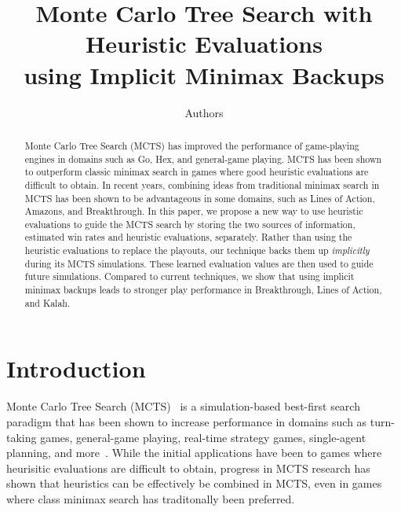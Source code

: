 \documentclass[letterpaper]{article}
\begin{document}
%
\title{Monte Carlo Tree Search with Heuristic Evaluations\\using Implicit Minimax Backups}
\author{Authors}

\maketitle

\begin{abstract}
Monte Carlo Tree Search (MCTS) has improved the performance of game-playing engines in 
domains such as Go, Hex, and general-game playing. MCTS has been shown to outperform 
classic minimax search in games where good heuristic evaluations are difficult to obtain. 
In recent years, combining ideas from traditional minimax search in MCTS has been shown to be advantageous in some domains, 
such as Lines of Action, Amazons, and Breakthrough.
In this paper, we propose 
a new way to use heuristic evaluations to guide the MCTS search by storing the two sources of 
information, estimated win rates and heuristic evaluations, separately. 
Rather than using the heuristic evaluations to replace the playouts, 
our technique backs them up {\it implicitly} during its MCTS simulations. 
These learned evaluation values are then used to guide future simulations. 
Compared to current techniques, we show that using implicit minimax backups  
leads to stronger play performance in Breakthrough, Lines of Action, and Kalah. 
\end{abstract}


\section{Introduction}

Monte Carlo Tree Search (MCTS)~\cite{Coulom06Efficient,Kocsis06Bandit} is a simulation-based best-first
search paradigm that has been shown to increase performance in domains such as turn-taking games, 
general-game playing, real-time strategy games, single-agent planning, and more~\cite{mctssurvey}. 
While the initial applications have been to games where heurisitic evaluations are difficult to obtain, 
progress in MCTS research has shown that heuristics can be effectively be combined in MCTS, even in games 
where class minimax search has traditonally been preferred. 
\end{document}
